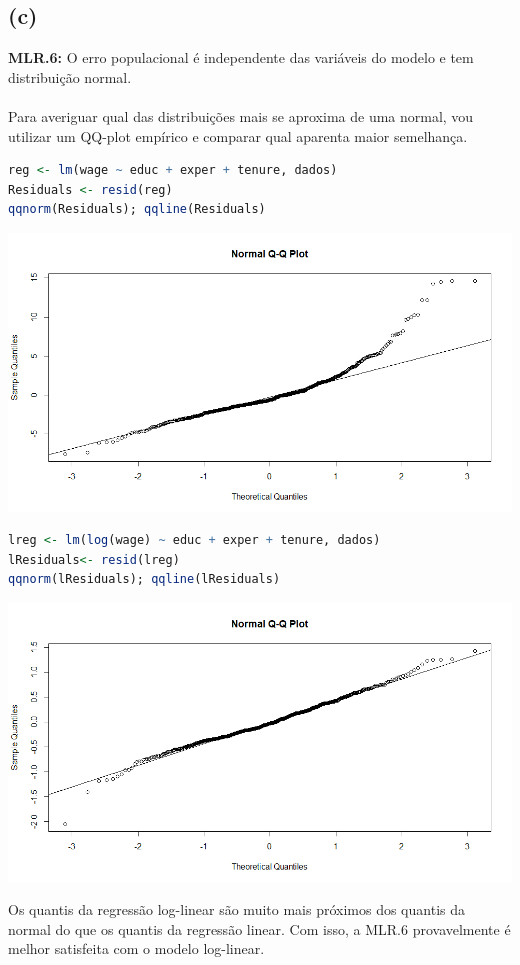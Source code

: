 \documentclass[12pt]{article}
\begin{document}
\subsection*{(c)}
\textbf{MLR.6:} O erro populacional é independente das variáveis do modelo e tem distribuição normal.\\\\
Para averiguar qual das distribuições mais se aproxima de uma normal, vou utilizar um QQ-plot empírico e comparar qual aparenta maior semelhança.

\begin{lstlisting}[language=R]
reg <- lm(wage ~ educ + exper + tenure, dados)
Residuals <- resid(reg)
qqnorm(Residuals); qqline(Residuals)
\end{lstlisting}
\begin{center}
	\includegraphics*[scale=0.7]{3.png}
\end{center}

\begin{lstlisting}[language=R]
lreg <- lm(log(wage) ~ educ + exper + tenure, dados)
lResiduals<- resid(lreg)
qqnorm(lResiduals); qqline(lResiduals)
\end{lstlisting}

\begin{center}
	\includegraphics*[scale=0.7]{4.png}
\end{center}

Os quantis da regressão log-linear são muito mais próximos dos quantis da normal do que os quantis da regressão linear. Com isso, a MLR.6 provavelmente é melhor satisfeita com o modelo log-linear.
\end{document}
